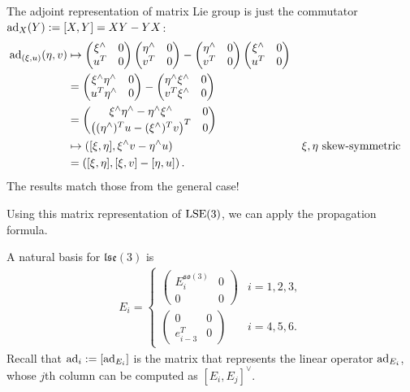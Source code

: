 \documentclass[12pt,class=article,crop=false]{standalone}
\begin{document}
The adjoint representation of matrix Lie group is just the commutator $ \operatorname{ad}_{ X}(Y) := [X,Y] = XY - YX$: 
\begin{align*}
	\operatorname{ad}_{ ( \xi, u)} (\eta,v) &\mapsto  \begin{pmatrix} \xi^\wedge & 0\\u^{T}&0 \end{pmatrix}  \begin{pmatrix}  \eta^\wedge &0\\v^{T}&0 \end{pmatrix} - \begin{pmatrix}  \eta^\wedge &0\\v^{T}&0 \end{pmatrix} \begin{pmatrix} \xi^\wedge & 0\\u^{T}&0 \end{pmatrix}\\
				  &= \begin{pmatrix} \xi^\wedge \eta^\wedge & 0\\ u^{T} \eta^\wedge &0 \end{pmatrix} -  \begin{pmatrix} \eta^\wedge \xi^\wedge & 0\\ v^{T} \xi^\wedge &0 \end{pmatrix}  \\
				  &= \begin{pmatrix} \xi^\wedge \eta^\wedge - \eta^\wedge \xi^\wedge &0 \\ \left( (\eta^\wedge)^{T}u - (\xi^\wedge )^{T} v  \right)^{T} &0 \end{pmatrix}  \\
				  &\mapsto  \left( [ \xi, \eta], \xi^\wedge v - \eta^\wedge u  \right) && \xi, \eta \text{ skew-symmetric}  \\
				  &= \left( [ \xi, \eta], [\xi,v] - [\eta,u] \right)  .
\end{align*}
The results match those from the general case!

Using this matrix representation of $ \operatorname{LSE}(3)$, we can apply the propagation formula.

A natural basis for $ \mathfrak{lse}(3) $ is
 \begin{align*}
	E_i = \begin{cases}
		\begin{pmatrix} E_i^{ \mathfrak{so}(3)}&0\\0&0 \end{pmatrix} & i = 1,2,3,\\
		\begin{pmatrix} 0& 0 \\ e_{i-3}^{T} & 0 \end{pmatrix} & i = 4,5,6 . 
	\end{cases}
\end{align*}
Recall that $ \operatorname{ad}_{ i} := [\operatorname{ad}_{ E_i}]$ is the matrix that represents the linear operator $ \operatorname{ad}_{ E_i}$, whose $ j$th column can be computed as $ [E_i, E_j]^\vee$.
\end{document}
